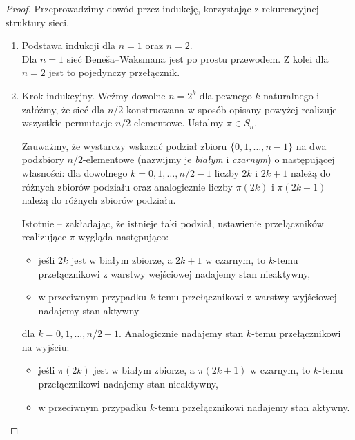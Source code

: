 \documentclass[a4paper]{article}
\theoremstyle{definition}
\begin{document}
\begin{proof}
Przeprowadzimy dowód przez indukcję, korzystając z rekurencyjnej struktury sieci. 

    \begin{enumerate} 
        \item Podstawa indukcji dla $n = 1$ oraz $n = 2$. \\
        Dla $n = 1$ sieć Beneša--Waksmana jest po prostu przewodem. Z kolei dla $n = 2$ jest to pojedynczy przełącznik.

        \item Krok indukcyjny. Weźmy dowolne $n = 2^k$ dla pewnego $k$ naturalnego i załóżmy, że sieć dla \(n/2\) konstruowana w sposób opisany powyżej realizuje wszystkie permutacje $n/2$-elementowe. 
        Ustalmy \(\pi \in S_n\).
        
        Zauważmy, że wystarczy wskazać podział zbioru \(\{0, 1, \ldots, n-1\}\) na dwa podzbiory \(n/2\)-elementowe (nazwijmy je \emph{białym} i \emph{czarnym}) o następującej własności: dla dowolnego \(k = 0, 1, \ldots, n/2 - 1\) liczby \(2k\) i \(2k+1\) należą do różnych zbiorów podziału oraz analogicznie liczby \(\pi(2k)\) i \(\pi(2k+1)\) należą do różnych zbiorów podziału.

        \vspace{.5em}

        Istotnie -- zakładając, że istnieje taki podział, ustawienie przełączników realizujące \(\pi\) wygląda następująco: 

        \begin{itemize}
            \item jeśli \(2k\) jest w białym zbiorze, a \(2k+1\) w czarnym, to \(k\)-temu przełącznikowi z warstwy wejściowej nadajemy stan nieaktywny,
            \item w przeciwnym przypadku \(k\)-temu przełącznikowi z warstwy wyjściowej nadajemy stan aktywny
        \end{itemize}
        dla \(k = 0, 1, \ldots, n/2-1\). Analogicznie nadajemy stan \(k\)-temu przełącznikowi na wyjściu:
        \begin{itemize}
            \item jeśli \(\pi(2k)\) jest w białym zbiorze, a \(\pi(2k+1)\) w czarnym, to \(k\)-temu przełącznikowi nadajemy stan nieaktywny,
            \item w przeciwnym przypadku \(k\)-temu przełącznikowi nadajemy stan aktywny.  
        \end{itemize}


\end{enumerate}
\end{proof}
\end{document}
